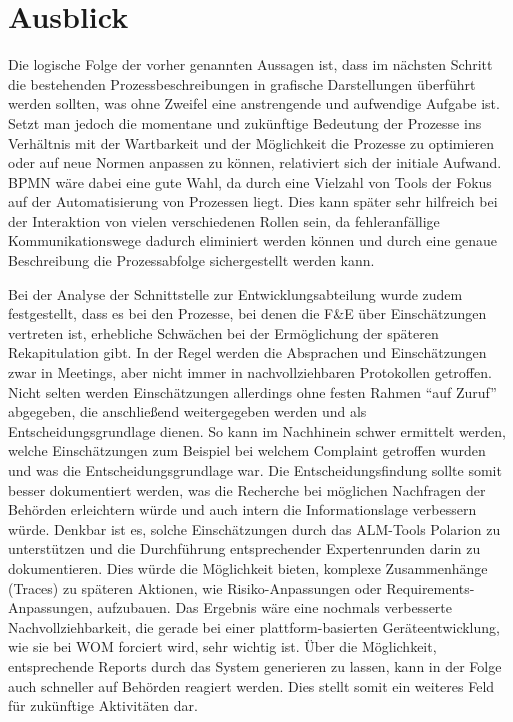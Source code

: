 \documentclass[a4paper,12pt]{report}
\begin{document}
\section{Ausblick}\label{sec:Ausblick}
Die logische Folge der vorher genannten Aussagen ist, dass im nächsten Schritt die bestehenden Prozessbeschreibungen in grafische Darstellungen überführt werden sollten, was ohne Zweifel eine anstrengende und aufwendige Aufgabe ist. Setzt man jedoch die momentane und zukünftige Bedeutung der Prozesse ins Verhältnis mit der Wartbarkeit und der Möglichkeit die Prozesse zu optimieren oder auf neue Normen anpassen zu können, relativiert sich der initiale Aufwand. BPMN wäre dabei eine gute Wahl, da durch eine Vielzahl von Tools der Fokus auf der Automatisierung von Prozessen liegt. Dies kann später sehr hilfreich bei der Interaktion von vielen verschiedenen Rollen sein, da fehleranfällige Kommunikationswege dadurch eliminiert werden können und durch eine genaue Beschreibung die Prozessabfolge sichergestellt werden kann.

Bei der Analyse der Schnittstelle zur Entwicklungsabteilung wurde zudem festgestellt, dass es bei den Prozesse, bei denen die F\&E über Einschätzungen vertreten ist, erhebliche Schwächen bei der Ermöglichung der späteren Rekapitulation gibt. In der Regel werden die Absprachen und Einschätzungen zwar in Meetings, aber nicht immer in nachvollziehbaren Protokollen getroffen. Nicht selten werden Einschätzungen allerdings ohne festen Rahmen "`auf Zuruf"' abgegeben, die anschließend weitergegeben werden und als Entscheidungsgrundlage dienen. So kann im Nachhinein schwer ermittelt werden, welche Einschätzungen zum Beispiel bei welchem Complaint getroffen wurden und was die Entscheidungsgrundlage war. Die Entscheidungsfindung sollte somit besser dokumentiert werden, was die Recherche bei möglichen Nachfragen der Behörden erleichtern würde und auch intern die Informationslage verbessern würde. Denkbar ist es, solche Einschätzungen durch das ALM-Tools Polarion zu unterstützen und die Durchführung entsprechender Expertenrunden darin zu dokumentieren. Dies würde die Möglichkeit bieten, komplexe Zusammenhänge (Traces) zu späteren Aktionen, wie Risiko-Anpassungen oder Requirements-Anpassungen, aufzubauen. Das Ergebnis wäre eine nochmals verbesserte Nachvollziehbarkeit, die gerade bei einer plattform-basierten Geräteentwicklung, wie sie bei WOM forciert wird, sehr wichtig ist. Über die Möglichkeit, entsprechende Reports durch das System generieren zu lassen, kann in der Folge auch schneller auf Behörden reagiert werden. Dies stellt somit ein weiteres Feld für zukünftige Aktivitäten dar.
  
\end{document}
